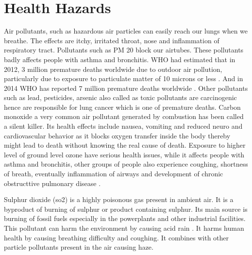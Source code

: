 \documentclass[sigconf]{acmart}
\begin{document}
\section{Health Hazards}
Air pollutants, such as  hazardous air particles can easily reach our lungs when we breathe. The effects are itchy, irritated throat, nose and inflammation of respiratory tract. Pollutants such as PM 20 block our airtubes. These pollutants badly affects people with asthma and bronchitis. WHO had estimated that in 2012, 3 million premature deaths worldwide due to outdoor air pollution, particularly due to exposure to particulate matter of 10 microns or less \cite{www-who}. And in 2014 WHO has reported 7 million premature deaths worldwide \cite{www-who}. Other pollutants such as lead, pesticides, arsenic also called as toxic pollutants are carcinogenic hence are responsible for lung cancer which is one of premature deaths. Carbon monoxide a very common air pollutant generated by combustion has been called a silent killer. Its health effects include nausea, vomiting and reduced neuro and cardiovascular behavior as it blocks oxygen transfer inside the body thereby might lead to death without knowing the real cause of death. Exposure to higher level of ground level ozone have serious health issues, while it affects people with asthma and bronchitis, other groups of people also experience coughing, shortness of breath, eventually inflammation of airways and development of chronic obstructtive pulmonary disease \cite{ozone}.

Sulphur dioxide (so2) is a highly poisonous gas present in ambient air. It is a byproduct of burning of sulphur or product containing sulphur. Its main source is burning of fossil fuels especially in the powerplants and other industrial facilities. This pollutant can harm the environment by causing acid rain \cite{sulphur}. It harms human health by causing breathing difficulty and coughing. It combines with other particle pollutants present in the air causing haze. 
\end{document}
